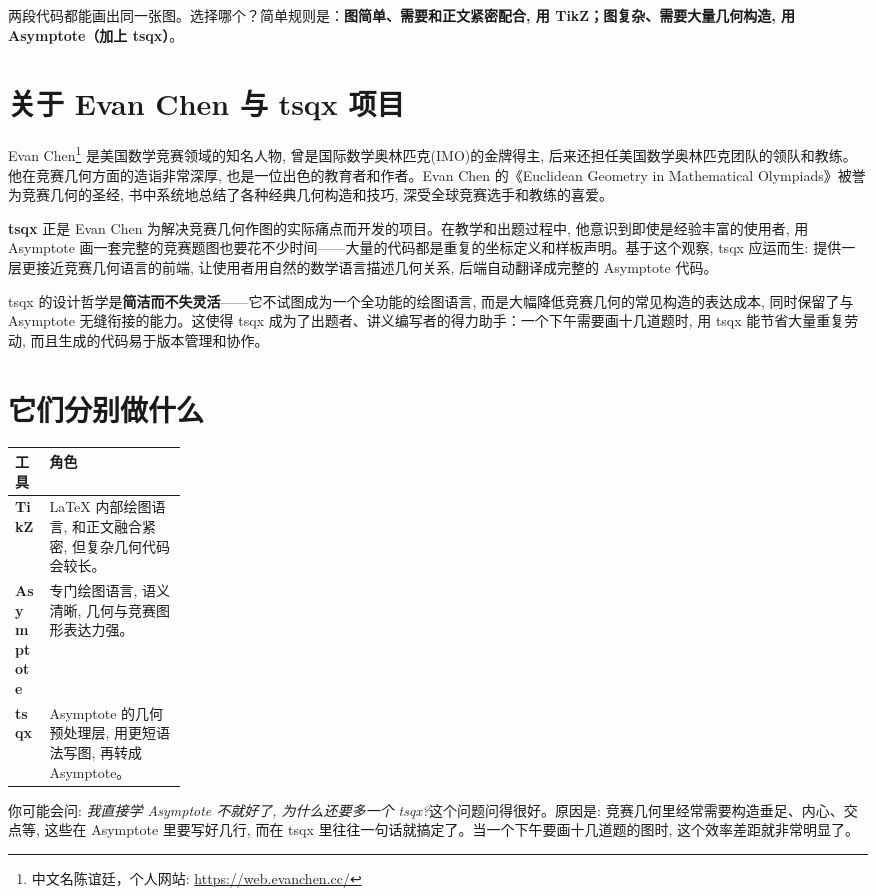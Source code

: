 \documentclass[11pt,oneside]{ctexbook}
\begin{document}
\medskip
两段代码都能画出同一张图。选择哪个？简单规则是：\textbf{图简单、需要和正文紧密配合, 用 TikZ；图复杂、需要大量几何构造, 用 Asymptote（加上 tsqx）}。

\section{关于 Evan Chen 与 tsqx 项目}

Evan Chen\footnote{中文名陈谊廷，个人网站: \url{https://web.evanchen.cc/}} 是美国数学竞赛领域的知名人物, 曾是国际数学奥林匹克(IMO)的金牌得主, 后来还担任美国数学奥林匹克团队的领队和教练。他在竞赛几何方面的造诣非常深厚, 也是一位出色的教育者和作者。Evan Chen 的《Euclidean Geometry in Mathematical Olympiads》被誉为竞赛几何的圣经, 书中系统地总结了各种经典几何构造和技巧, 深受全球竞赛选手和教练的喜爱。

\textbf{tsqx} 正是 Evan Chen 为解决竞赛几何作图的实际痛点而开发的项目。在教学和出题过程中, 他意识到即使是经验丰富的使用者, 用 Asymptote 画一套完整的竞赛题图也要花不少时间——大量的代码都是重复的坐标定义和样板声明。基于这个观察, tsqx 应运而生: 提供一层更接近竞赛几何语言的前端, 让使用者用自然的数学语言描述几何关系, 后端自动翻译成完整的 Asymptote 代码。

tsqx 的设计哲学是\textbf{简洁而不失灵活}——它不试图成为一个全功能的绘图语言, 而是大幅降低竞赛几何的常见构造的表达成本, 同时保留了与 Asymptote 无缝衔接的能力。这使得 tsqx 成为了出题者、讲义编写者的得力助手：一个下午需要画十几道题时, 用 tsqx 能节省大量重复劳动, 而且生成的代码易于版本管理和协作。

\section{它们分别做什么}
\begin{tabularx}{0.94\linewidth}{@{}>{\bfseries}p{0.20\linewidth}X@{}}
	\toprule
	工具        & 角色                                         \\
	\midrule
	TikZ      & LaTeX 内部绘图语言, 和正文融合紧密, 但复杂几何代码会较长。         \\
	Asymptote & 专门绘图语言, 语义清晰, 几何与竞赛图形表达力强。                 \\
	tsqx      & Asymptote 的几何预处理层, 用更短语法写图, 再转成 Asymptote。 \\
	\bottomrule
\end{tabularx}

\vspace{1cm}

你可能会问: \textit{我直接学 Asymptote 不就好了, 为什么还要多一个 tsqx?}这个问题问得很好。原因是: 竞赛几何里经常需要构造垂足、内心、交点等, 这些在 Asymptote 里要写好几行, 而在 tsqx 里往往一句话就搞定了。当一个下午要画十几道题的图时, 这个效率差距就非常明显了。
\end{document}
